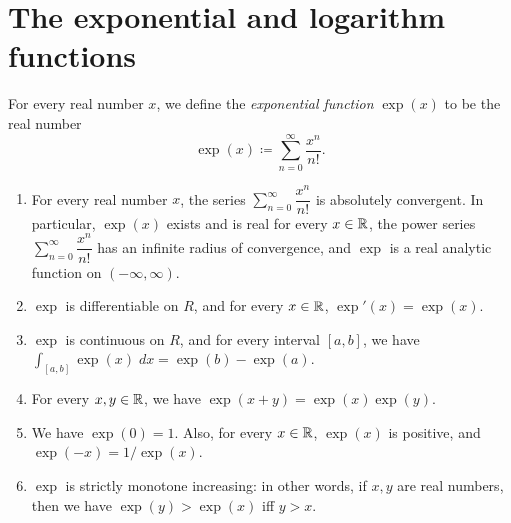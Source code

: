 \section{The exponential and logarithm functions}\label{ii:sec:4.5}

\begin{defn}\label{ii:4.5.1}
  For every real number \(x\), we define the \emph{exponential function} \(\exp(x)\) to be the real number
  \[
    \exp(x) \coloneqq \sum_{n = 0}^\infty \dfrac{x^n}{n!}.
  \]
\end{defn}

\begin{thm}\label{ii:4.5.2}
  \quad
  \begin{enumerate}
    \item For every real number \(x\), the series \(\sum_{n = 0}^\infty \dfrac{x^n}{n!}\) is absolutely convergent.
          In particular, \(\exp(x)\) exists and is real for every \(x \in \mathbb{R}\), the power series \(\sum_{n = 0}^\infty \dfrac{x^n}{n!}\) has an infinite radius of convergence, and \(\exp\) is a real analytic function on \((-\infty, \infty)\).
    \item \(\exp\) is differentiable on \(R\), and for every \(x \in \mathbb{R}\), \(\exp'(x) = \exp(x)\).
    \item \(\exp\) is continuous on \(R\), and for every interval \([a, b]\), we have \(\int_{[a, b]} \exp(x) \; dx = \exp(b) - \exp(a)\).
    \item For every \(x, y \in \mathbb{R}\), we have \(\exp(x + y) = \exp(x) \exp(y)\).
    \item We have \(\exp(0) = 1\).
          Also, for every \(x \in \mathbb{R}\), \(\exp(x)\) is positive, and \(\exp(-x) = 1 / \exp(x)\).
    \item \(\exp\) is strictly monotone increasing:
          in other words, if \(x, y\) are real numbers, then we have \(\exp(y) > \exp(x)\) iff \(y > x\).
  \end{enumerate}
\end{thm}

